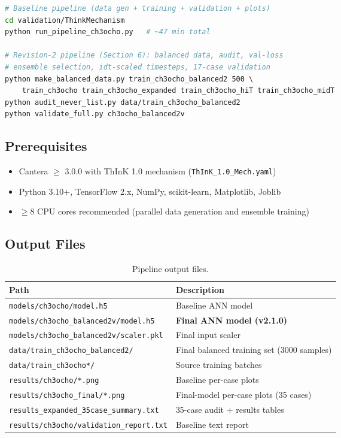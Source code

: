 \documentclass[11pt,a4paper]{article}
\begin{document}
\begin{lstlisting}[language=bash]
# Baseline pipeline (data gen + training + validation + plots)
cd validation/ThinkMechanism
python run_pipeline_ch3ocho.py   # ~47 min total

# Revision-2 pipeline (Section 6): balanced data, audit, val-loss
# ensemble selection, idt-scaled timesteps, 17-case validation
python make_balanced_data.py train_ch3ocho_balanced2 500 \
    train_ch3ocho train_ch3ocho_expanded train_ch3ocho_hiT train_ch3ocho_midT
python audit_never_list.py data/train_ch3ocho_balanced2
python validate_full.py ch3ocho_balanced2v
\end{lstlisting}

\subsection{Prerequisites}

\begin{itemize}
    \item Cantera $\geq$ 3.0.0 with ThInK 1.0 mechanism (\texttt{ThInK\_1.0\_Mech.yaml})
    \item Python 3.10+, TensorFlow 2.x, NumPy, scikit-learn, Matplotlib, Joblib
    \item $\geq$8 CPU cores recommended (parallel data generation and ensemble training)
\end{itemize}

\subsection{Output Files}

\begin{table}[H]
\centering
\caption{Pipeline output files.}
\label{tab:outputs}
\begin{tabular}{ll}
\toprule
\textbf{Path} & \textbf{Description} \\
\midrule
\texttt{models/ch3ocho/model.h5} & Baseline ANN model \\
\texttt{models/ch3ocho\_balanced2v/model.h5} & \textbf{Final ANN model (v2.1.0)} \\
\texttt{models/ch3ocho\_balanced2v/scaler.pkl} & Final input scaler \\
\texttt{data/train\_ch3ocho\_balanced2/} & Final balanced training set (3000 samples) \\
\texttt{data/train\_ch3ocho*/} & Source training batches \\
\texttt{results/ch3ocho/*.png} & Baseline per-case plots \\
\texttt{results/ch3ocho\_final/*.png} & Final-model per-case plots (35 cases) \\
\texttt{results\_expanded\_35case\_summary.txt} & 35-case audit + results tables \\
\texttt{results/ch3ocho/validation\_report.txt} & Baseline text report \\
\bottomrule
\end{tabular}
\end{table}
\end{document}
